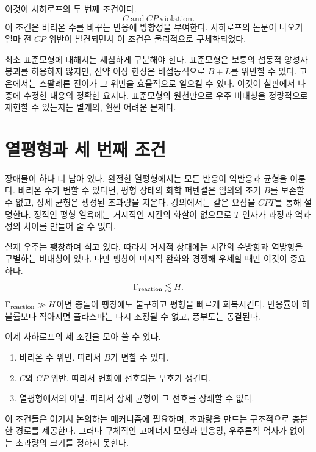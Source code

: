 이것이 사하로프의 두 번째 조건이다.
\begin{equation}
\boxed{C\ \text{and}\ CP\ \text{violation}.}
\end{equation}
이 조건은 바리온 수를 바꾸는 반응에 방향성을 부여한다. 사하로프의 논문이 나오기 얼마 전 \(CP\) 위반이 발견되면서 이 조건은 물리적으로 구체화되었다.

최소 표준모형에 대해서는 세심하게 구분해야 한다. 표준모형은 보통의 섭동적 양성자 붕괴를 허용하지 않지만, 전약 이상 현상은 비섭동적으로 \(B+L\)를 위반할 수 있다. 고온에서는 스팔레론 전이가 그 위반을 효율적으로 일으킬 수 있다. 이것이 칠판에서 나중에 수정한 내용의 정확한 요지다. 표준모형의 원천만으로 우주 비대칭을 정량적으로 재현할 수 있는지는 별개의, 훨씬 어려운 문제다.

\section{열평형과 세 번째 조건}

장애물이 하나 더 남아 있다. 완전한 열평형에서는 모든 반응이 역반응과 균형을 이룬다. 바리온 수가 변할 수 있다면, 평형 상태의 화학 퍼텐셜은 임의의 초기 \(B\)를 보존할 수 없고, 상세 균형은 생성된 초과량을 지운다. 강의에서는 같은 요점을 \(CPT\)를 통해 설명한다. 정적인 평형 열욕에는 거시적인 시간의 화살이 없으므로 \(T\) 인자가 과정과 역과정의 차이를 만들어 줄 수 없다.

실제 우주는 팽창하며 식고 있다. 따라서 거시적 상태에는 시간의 순방향과 역방향을 구별하는 비대칭이 있다. 다만 팽창이 미시적 완화와 경쟁해 우세할 때만 이것이 중요하다.
\begin{equation}
\Gamma_{\rm reaction}\lesssim H.
\label{eq:c08-freezeout-condition}
\end{equation}
\(\Gamma_{\rm reaction}\gg H\)이면 충돌이 팽창에도 불구하고 평형을 빠르게 회복시킨다. 반응률이 허블률보다 작아지면 플라스마는 다시 조정될 수 없고, 풍부도는 동결된다.

\begin{classroomqa}
\end{classroomqa}

이제 사하로프의 세 조건을 모아 쓸 수 있다.
\begin{enumerate}
\item 바리온 수 위반. 따라서 \(B\)가 변할 수 있다.
\item \(C\)와 \(CP\) 위반. 따라서 변화에 선호되는 부호가 생긴다.
\item 열평형에서의 이탈. 따라서 상세 균형이 그 선호를 상쇄할 수 없다.
\end{enumerate}
이 조건들은 여기서 논의하는 메커니즘에 필요하며, 초과량을 만드는 구조적으로 충분한 경로를 제공한다. 그러나 구체적인 고에너지 모형과 반응망, 우주론적 역사가 없이는 초과량의 크기를 정하지 못한다.

